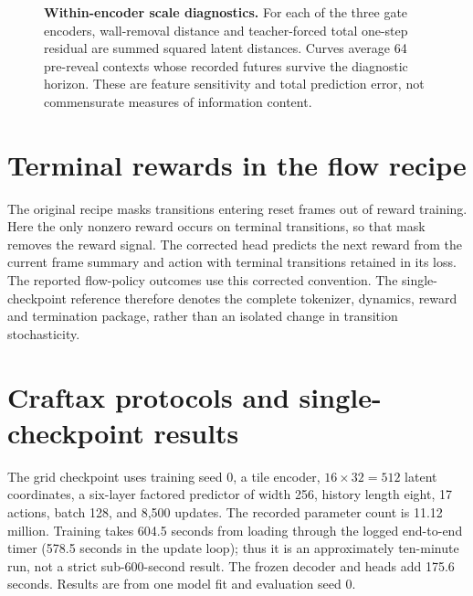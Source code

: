 \begin{table}[ht]
\centering
\caption{JEPA geometry and decoded wall intensity for model seed $0$, averaged over $64$
pre-reveal contexts. Distances use matched actions and the same encoder; total residuals include
all latent coordinates. Wall intensity is measured on shared wall pixels.}
\label{tab:latent}
\end{table}

\begin{figure}[t]
\centering
{}
\caption{\textbf{Within-encoder scale diagnostics.} For each of the three gate encoders, wall-removal
distance and teacher-forced total one-step residual are summed squared latent distances. Curves
average 64 pre-reveal contexts whose recorded futures survive the diagnostic horizon. These are
feature sensitivity and total prediction error, not commensurate measures of information content.}
\label{fig:geometry}
\end{figure}

\clearpage
\section{Terminal rewards in the flow recipe}
\label{app:rewardbug}

The original recipe masks transitions entering reset frames out of reward training. Here the only
nonzero reward occurs on terminal transitions, so that mask removes the reward signal.
The corrected head predicts the next reward from the current frame summary and action with
terminal transitions retained in its loss. The reported flow-policy outcomes use this corrected
convention. The single-checkpoint reference therefore denotes the complete tokenizer, dynamics,
reward and termination package, rather than an isolated change in transition stochasticity.


\section{Craftax protocols and single-checkpoint results}
\label{app:craftax}

The grid checkpoint uses training seed 0, a tile encoder, $16\times32=512$ latent coordinates,
a six-layer factored predictor of width 256, history length eight, 17 actions, batch 128, and
8,500 updates. The recorded parameter count is 11.12 million. Training takes 604.5 seconds from
loading through the logged end-to-end timer (578.5 seconds in the update loop); thus it is an
approximately ten-minute run, not a strict sub-600-second result. The frozen decoder and heads add
175.6 seconds. Results are from one model fit and evaluation seed 0.

